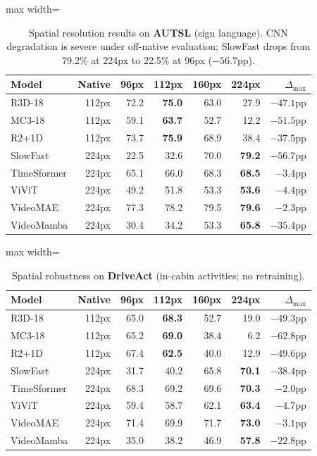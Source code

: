 \documentclass[runningheads]{llncs}
\newcommand{\tabtight}{\setlength{\tabcolsep}{3.5pt}\renewcommand{\arraystretch}{1.12}}
\begin{document}
\begin{table}[!htbp]
\centering
\caption{Spatial resolution results on \textbf{AUTSL} (sign language). CNN degradation is severe under off-native evaluation; SlowFast drops from 79.2\% at 224px to 22.5\% at 96px ($-56.7$pp).}
\label{tab:sup_sp_autsl}
\scriptsize\tabtight
\begin{adjustbox}{max width=\textwidth}
\begin{tabular}{l r rrrr r}
\toprule
Model & Native & 96px & 112px & 160px & 224px & $\Delta_\text{max}$ \\
\midrule
R3D-18      & 112px & 72.2 & \textbf{75.0} & 63.0 & 27.9 & $-47.1$pp \\
MC3-18      & 112px & 59.1 & \textbf{63.7} & 52.7 & 12.2 & $-51.5$pp \\
R2+1D       & 112px & 73.7 & \textbf{75.9} & 68.9 & 38.4 & $-37.5$pp \\
SlowFast    & 224px & 22.5 & 32.6 & 70.0 & \textbf{79.2} & $-56.7$pp \\
\midrule
TimeSformer & 224px & 65.1 & 66.0 & 68.3 & \textbf{68.5} & $-3.4$pp \\
ViViT       & 224px & 49.2 & 51.8 & 53.3 & \textbf{53.6} & $-4.4$pp \\
VideoMAE    & 224px & 77.3 & 78.2 & 79.5 & \textbf{79.6} & $-2.3$pp \\
VideoMamba  & 224px & 30.4 & 34.2 & 53.3 & \textbf{65.8} & $-35.4$pp \\
\bottomrule
\end{tabular}
\end{adjustbox}
\end{table}

\begin{table}[!htbp]
\centering
\caption{Spatial robustness on \textbf{DriveAct} (in-cabin activities; no retraining).}
\label{tab:sup_sp_drive}
\scriptsize\tabtight
\begin{adjustbox}{max width=\textwidth}
\begin{tabular}{l r rrrr r}
\toprule
Model & Native & 96px & 112px & 160px & 224px & $\Delta_\text{max}$ \\
\midrule
R3D-18      & 112px & 65.0 & \textbf{68.3} & 52.7 & 19.0 & $-49.3$pp \\
MC3-18      & 112px & 65.2 & \textbf{69.0} & 38.4 &  6.2 & $-62.8$pp \\
R2+1D       & 112px & 67.4 & \textbf{62.5} & 40.0 & 12.9 & $-49.6$pp \\
SlowFast    & 224px & 31.7 & 40.2 & 65.8 & \textbf{70.1} & $-38.4$pp \\
\midrule
TimeSformer & 224px & 68.3 & 69.2 & 69.6 & \textbf{70.3} & $-2.0$pp \\
ViViT       & 224px & 59.4 & 58.7 & 62.1 & \textbf{63.4} & $-4.7$pp \\
VideoMAE    & 224px & 71.4 & 69.9 & 71.7 & \textbf{73.0} & $-3.1$pp \\
VideoMamba  & 224px & 35.0 & 38.2 & 46.9 & \textbf{57.8} & $-22.8$pp \\
\bottomrule
\end{tabular}
\end{adjustbox}
\end{table}
\end{document}
